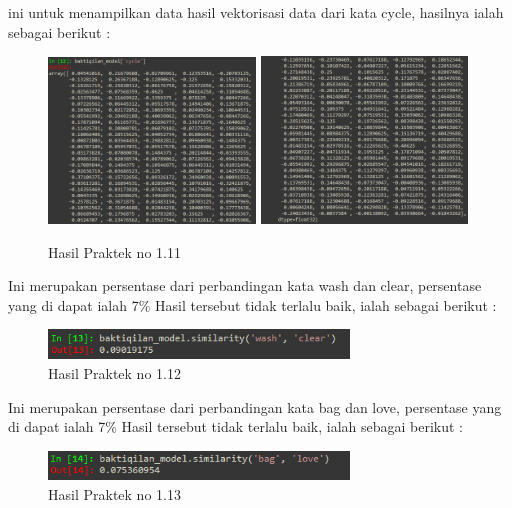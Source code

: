 
ini untuk menampilkan data hasil vektorisasi data dari kata cycle, hasilnya ialah sebagai berikut :
\begin{figure}[H]
	\centering
	\includegraphics[width=5.5cm]{figures/1174083/figures5/28.png}
	\includegraphics[width=5.5cm]{figures/1174083/figures5/29.png}
	\caption{Hasil Praktek no 1.11}
\end{figure}


Ini merupakan persentase dari perbandingan kata wash dan clear, persentase yang di dapat ialah 7\% Hasil tersebut tidak terlalu baik, ialah sebagai berikut :
\begin{figure}[H]
	\centering
	\includegraphics[width=8cm]{figures/1174083/figures5/30.png}
	\caption{Hasil Praktek no 1.12}
\end{figure}


Ini merupakan persentase dari perbandingan kata bag dan love, persentase yang di dapat ialah 7\% Hasil tersebut tidak terlalu baik, ialah sebagai berikut :
\begin{figure}[H]
	\centering
	\includegraphics[width=8cm]{figures/1174083/figures5/31.png}
	\caption{Hasil Praktek no 1.13}
\end{figure}

